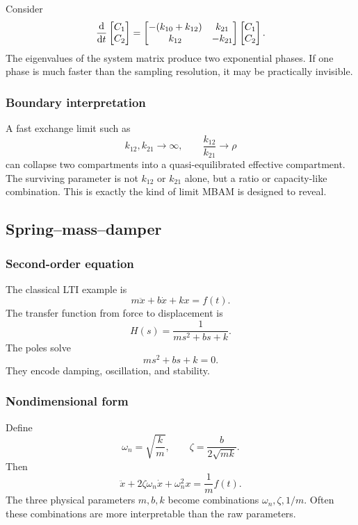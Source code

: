 Consider
\[
  \frac{\mathop{}\!\mathrm{d}}{\mathop{}\!\mathrm{d} t}
  \begin{bmatrix}
    C_1\\ C_2
  \end{bmatrix}
  =
  \begin{bmatrix}
    -(k_{10}+k_{12}) & k_{21}\\
    k_{12} & -k_{21}
  \end{bmatrix}
  \begin{bmatrix}
    C_1\\ C_2
  \end{bmatrix}.
\]
The eigenvalues of the system matrix produce two exponential phases.  If one phase is much faster than the sampling resolution, it may be practically invisible.

\subsubsection*{Boundary interpretation}

A fast exchange limit such as
\[
  k_{12},k_{21}\to\infty,
  \qquad
  \frac{k_{12}}{k_{21}}\to \rho
\]
can collapse two compartments into a quasi-equilibrated effective compartment.  The surviving parameter is not \(k_{12}\) or \(k_{21}\) alone, but a ratio or capacity-like combination.  This is exactly the kind of limit MBAM is designed to reveal.

\subsection{Spring--mass--damper}

\subsubsection*{Second-order equation}

The classical LTI example is
\[
  m\ddot{x}+b\dot{x}+kx=f(t).
\]
The transfer function from force to displacement is
\[
  H(s)=\frac{1}{ms^2+bs+k}.
\]
The poles solve
\[
  ms^2+bs+k=0.
\]
They encode damping, oscillation, and stability.

\subsubsection*{Nondimensional form}

Define
\[
  \omega_n=\sqrt{\frac{k}{m}},
  \qquad
  \zeta=\frac{b}{2\sqrt{mk}}.
\]
Then
\[
  \ddot{x}+2\zeta\omega_n\dot{x}+\omega_n^2x=\frac{1}{m}f(t).
\]
The three physical parameters \(m,b,k\) become combinations \(\omega_n,\zeta,1/m\).  Often these combinations are more interpretable than the raw parameters.

